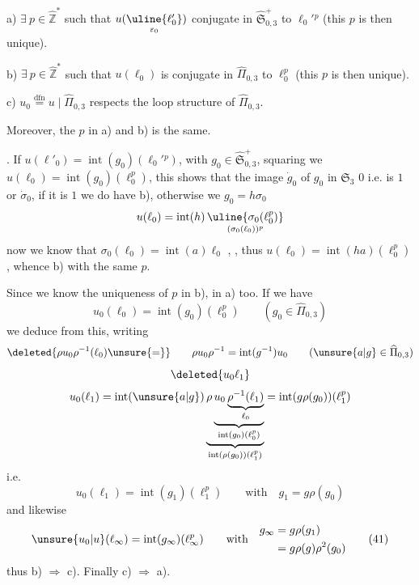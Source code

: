 a) $\exists\ p\in\widehat{\mathbb Z}^{*}$ such that
$u(\underset{\varepsilon_0}{\uline{\ell'_0}})$ conjugate in
$\widehat{\mathfrak S}_{0,3}^{+}$ to $\ell_0'{}^p$
(this $p$ is then unique).

b) $\exists\ p\in\widehat{\mathbb Z}^{*}$ such that $u(\ell_0)$ is conjugate in
$\widehat\Pi_{0,3}$ to $\ell_0^p$ (this $p$ is then unique).

c) $u_0\overset{\mathrm{dfn}}{=}u\mid\widehat\Pi_{0,3}$ respects the loop structure of $\widehat\Pi_{0,3}$.

Moreover, the $p$ in a) and b) is the same.

\uline{}. If $u(\ell'_0)=\operatorname{int}(g_0)(\ell_0'{}^p)$, with
$g_0\in\widehat{\mathfrak S}_{0,3}^{+}$,
squaring we  $u(\ell_0)=\operatorname{int}(g_0)(\ell_0^p)$,
this shows that the image $\dot g_0$ of $g_0$ in $\mathfrak S_3$
 $0$ i.e. is  $1$ or $\dot\sigma_0$,
 if it is $1$ we do have b), otherwise we 
$g_0=h\sigma_0$ 
\[
u(\ell_0)=\operatorname{int}(h)\,
\underset{(\sigma_0(\ell_0))^p}{\uline{\sigma_0(\ell_0^p)}}
\]
now we know that $\sigma_0(\ell_0)=\operatorname{int}(a)\ell_0$
,
,
thus $u(\ell_0)=\operatorname{int}(ha)(\ell_0^p)$, whence b) with the same $p$.


Since we know the uniqueness of $p$ in b), in a) too. If we have
\begin{equation}
u_0(\ell_0)=\operatorname{int}(g_0)(\ell_0^p)
\qquad (g_0\in\widehat\Pi_{0,3})
\tag{39}
\end{equation}
we deduce from this, writing
\[
\deleted{\rho u_0\rho^{-1}(\ell_0)\unsure{=}}
\qquad
\rho u_0\rho^{-1}=\operatorname{int}(g^{-1})u_0
\qquad (\unsure{a|g}\in\widehat\Pi_{0,3})
\]
\[
\deleted{u_0 \ell_1}
\]
\[
u_0(\ell_1)=\operatorname{int}(\unsure{a|g})
\underbrace{\rho\underbrace{u_0\underbrace{\rho^{-1}(\ell_1)}_{\ell_0}}_{
\operatorname{int}(g_0)(\ell_0^p)}}_{
\operatorname{int}(\rho(g_0))(\ell_1^p)}
=\operatorname{int}(g\rho(g_0))(\ell_1^p)
\]
i.e.
\begin{equation}
u_0(\ell_1)=\operatorname{int}(g_1)(\ell_1^p)
\qquad\text{with}\quad g_1=g\rho(g_0)
\tag{40}
\end{equation}
and likewise
\begin{equation}
\unsure{u_0|u}(\ell_\infty)=\operatorname{int}(g_\infty)(\ell_\infty^p)
\qquad\text{with}\quad
\begin{aligned}
g_\infty&=g\rho(g_1)\\
&=g\rho(g)\rho^2(g_0)
\end{aligned}
\tag{41}
\end{equation}
thus b) $\Rightarrow$ c). Finally  c) $\Rightarrow$ a).


